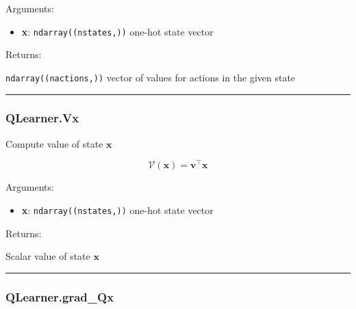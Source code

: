 Arguments:

\begin{itemize}
\tightlist
\item
  \textbf{x}: \texttt{ndarray((nstates,))} one-hot state vector
\end{itemize}

Returns:

\texttt{ndarray((nactions,))} vector of values for actions in the given
state

\begin{center}\rule{0.5\linewidth}{\linethickness}\end{center}

\subsubsection{QLearner.Vx}\label{qlearner.vx}

\begin{Shaded}
\begin{Highlighting}[]
\end{Highlighting}
\end{Shaded}

Compute value of state \(\mathbf x\)

\[
\mathcal V(\mathbf x) = \mathbf v^\top \mathbf x
\]

Arguments:

\begin{itemize}
\tightlist
\item
  \textbf{x}: \texttt{ndarray((nstates,))} one-hot state vector
\end{itemize}

Returns:

Scalar value of state \(\mathbf x\)

\begin{center}\rule{0.5\linewidth}{\linethickness}\end{center}

\subsubsection{QLearner.grad\_Qx}\label{qlearner.grad_qx}

\begin{Shaded}
\begin{Highlighting}[]
\end{Highlighting}
\end{Shaded}

